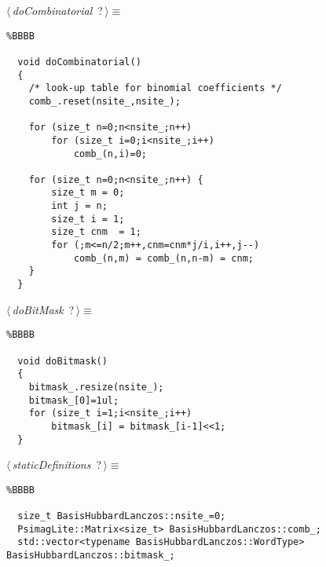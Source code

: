\documentclass{report}
\begin{document}
\begin{flushleft} \small
\begin{minipage}{\linewidth}\label{scrap13}\raggedright\small
{} $\langle\,${\it doCombinatorial}\nobreak\ {\footnotesize {?}}$\,\rangle\equiv$
\begin{lstlisting}%BBBB
    
  void doCombinatorial()  
  {  
  	/* look-up table for binomial coefficients */  
  	comb_.reset(nsite_,nsite_);  
    
  	for (size_t n=0;n<nsite_;n++)  
  		for (size_t i=0;i<nsite_;i++)  
  			comb_(n,i)=0;  
    
  	for (size_t n=0;n<nsite_;n++) {  
  		size_t m = 0;  
  		int j = n;  
  		size_t i = 1;  
  		size_t cnm  = 1;  
  		for (;m<=n/2;m++,cnm=cnm*j/i,i++,j--)  
  			comb_(n,m) = comb_(n,n-m) = cnm;  
  	}  
  }  \end{lstlisting}
\end{minipage}\vspace{4ex}
\end{flushleft}
\begin{flushleft} \small
\begin{minipage}{\linewidth}\label{scrap14}\raggedright\small
{} $\langle\,${\it doBitMask}\nobreak\ {\footnotesize {?}}$\,\rangle\equiv$
\begin{lstlisting}%BBBB
    
  void doBitmask()  
  {  
  	bitmask_.resize(nsite_);  
  	bitmask_[0]=1ul;  
  	for (size_t i=1;i<nsite_;i++)  
  		bitmask_[i] = bitmask_[i-1]<<1;  
  }  \end{lstlisting}
\end{minipage}\vspace{4ex}
\end{flushleft}
\begin{flushleft} \small
\begin{minipage}{\linewidth}\label{scrap15}\raggedright\small
{} $\langle\,${\it staticDefinitions}\nobreak\ {\footnotesize {?}}$\,\rangle\equiv$
\begin{lstlisting}%BBBB
    
  size_t BasisHubbardLanczos::nsite_=0;  
  PsimagLite::Matrix<size_t> BasisHubbardLanczos::comb_;  
  std::vector<typename BasisHubbardLanczos::WordType> BasisHubbardLanczos::bitmask_;  \end{lstlisting}
\end{minipage}\vspace{4ex}
\end{flushleft}
\end{document}
